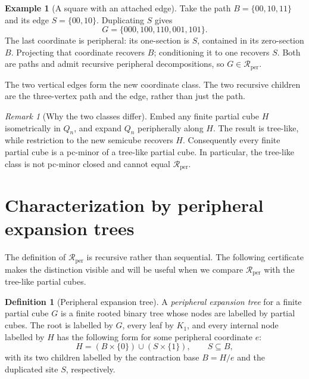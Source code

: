 \documentclass[11pt]{article}
\theoremstyle{definition}
\newtheorem{definition}[theorem]{Definition}
\newtheorem{example}[theorem]{Example}
\theoremstyle{remark}
\newtheorem{remark}[theorem]{Remark}
\newcommand{\Rper}{\mathcal R_{\mathrm{per}}}
\begin{document}
\begin{example}[A square with an attached edge]
\label{ex:peripheral-step}
Take the path \(B=\{00,10,11\}\) and its edge \(S=\{00,10\}\). Duplicating
\(S\) gives
\[
 G=\{000,100,110,001,101\}.
\]
The last coordinate is peripheral: its one-section is \(S\), contained
in its zero-section \(B\). Projecting that coordinate recovers \(B\);
conditioning it to one recovers \(S\). Both are paths and admit recursive
peripheral decompositions, so \(G\in\Rper\).
\begin{center}
\end{center}
The two vertical edges form the new coordinate class. The two recursive
children are the three-vertex path and the edge, rather than just the path.
\end{example}

\begin{remark}[Why the two classes differ]
\label{rem:tree-like-not-hereditary}
Embed any finite partial cube \(H\) isometrically in \(Q_n\), and expand
\(Q_n\) peripherally along \(H\).  The result is tree-like, while restriction
to the new semicube recovers \(H\).  Consequently every finite partial cube
is a pc-minor of a tree-like partial cube.  In particular, the tree-like
class is not pc-minor closed and cannot equal \(\Rper\).
\end{remark}

\section{Characterization by peripheral expansion trees}
\label{sec:expansion-characterization}

The definition of \(\Rper\) is recursive rather than sequential.  The
following certificate makes the distinction visible and will be useful when
we compare \(\Rper\) with the tree-like partial cubes.

\begin{definition}[Peripheral expansion tree]
\label{def:peripheral-expansion-tree}
A \emph{peripheral expansion tree} for a finite partial cube \(G\) is a
finite rooted binary tree whose nodes are labelled by partial cubes.  The
root is labelled by \(G\), every leaf by \(K_1\), and every internal node
labelled by \(H\) has the following form for some peripheral coordinate
\(e\):
\[
 H=(B\times\{0\})\cup(S\times\{1\}),
 \qquad S\subseteq B,
\]
with its two children labelled by the contraction base \(B=H/e\) and the
duplicated site \(S\), respectively.
\end{definition}
\end{document}
